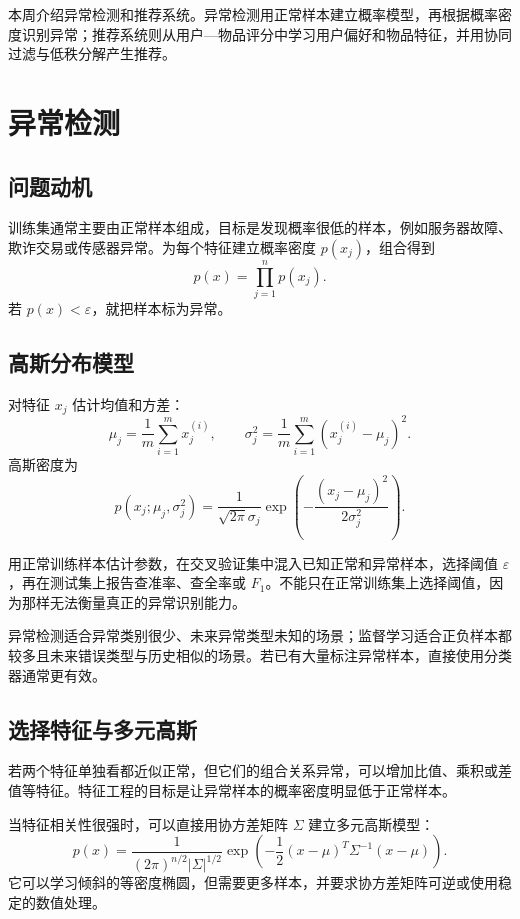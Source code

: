 


\begin{summarybox}
本周介绍异常检测和推荐系统。异常检测用正常样本建立概率模型，再根据概率密度识别异常；推荐系统则从用户—物品评分中学习用户偏好和物品特征，并用协同过滤与低秩分解产生推荐。
\end{summarybox}

\section{异常检测}
\subsection{问题动机}
\begin{definitionbox}[异常检测设定]
训练集通常主要由正常样本组成，目标是发现概率很低的样本，例如服务器故障、欺诈交易或传感器异常。为每个特征建立概率密度 $p(x_j)$，组合得到
\[
p(x)=\prod_{j=1}^{n}p(x_j).
\]
若 $p(x)<\varepsilon$，就把样本标为异常。
\end{definitionbox}
\subsection{高斯分布模型}
\begin{definitionbox}[单变量高斯分布]
对特征 $x_j$ 估计均值和方差：
\[
\mu_j=\frac1m\sum_{i=1}^{m}x_j^{(i)},\qquad
\sigma_j^2=\frac1m\sum_{i=1}^{m}(x_j^{(i)}-\mu_j)^2.
\]
高斯密度为
\[
p(x_j;\mu_j,\sigma_j^2)=\frac1{\sqrt{2\pi}\sigma_j}
\exp\!\left(-\frac{(x_j-\mu_j)^2}{2\sigma_j^2}\right).
\]
\end{definitionbox}
\begin{keybox}[开发与评价]
用正常训练样本估计参数，在交叉验证集中混入已知正常和异常样本，选择阈值 $\varepsilon$，再在测试集上报告查准率、查全率或 $F_1$。不能只在正常训练集上选择阈值，因为那样无法衡量真正的异常识别能力。
\end{keybox}
\begin{tipbox}[异常检测与监督学习]
异常检测适合异常类别很少、未来异常类型未知的场景；监督学习适合正负样本都较多且未来错误类型与历史相似的场景。若已有大量标注异常样本，直接使用分类器通常更有效。
\end{tipbox}
\subsection{选择特征与多元高斯}
\begin{examplebox}[构造更有辨识力的特征]
若两个特征单独看都近似正常，但它们的组合关系异常，可以增加比值、乘积或差值等特征。特征工程的目标是让异常样本的概率密度明显低于正常样本。
\end{examplebox}
\begin{definitionbox}[多元高斯分布]
当特征相关性很强时，可以直接用协方差矩阵 $\Sigma$ 建立多元高斯模型：
\[
p(x)=\frac1{(2\pi)^{n/2}|\Sigma|^{1/2}}
\exp\!\left(-\frac12(x-\mu)^T\Sigma^{-1}(x-\mu)\right).
\]
它可以学习倾斜的等密度椭圆，但需要更多样本，并要求协方差矩阵可逆或使用稳定的数值处理。
\end{definitionbox}

